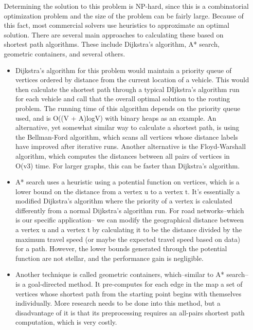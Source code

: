 \documentclass[onecolumn, draftclsnofoot,10pt, compsoc]{IEEEtran}
\begin{document}
Determining the solution to this problem is NP-hard, since this is a combinatorial optimization problem and the size of the problem can be fairly large.
Because of this fact, most commercial solvers use heuristics to approximate an optimal solution.
There are several main approaches to calculating these based on shortest path algorithms.
These include Dijkstra's algorithm, A* search, geometric containers, and several others.
\begin{itemize}
\item
Dijkstra's algorithm for this problem would maintain a priority queue of vertices ordered by distance from the current location of a vehicle.
This would then calculate the shortest path through a typical DIjkstra's algorithm run for each vehicle and call that the overall optimal solution to the routing problem.
The running time of this algorithm depends on the priority queue used, and is O((V + A)logV) with binary heaps as an example.
An alternative, yet somewhat similar way to calculate a shortest path, is using the Bellman-Ford algorithm, which scans all vertices whose distance labels have improved after iterative runs.
Another alternative is the Floyd-Warshall algorithm, which computes the distances between all pairs of vertices in O(v3) time.
For larger graphs, this can be faster than Dijkstra's algorithm\cite{bast2016route}.
\item
A* search uses a heuristic using a potential function on vertices, which is a lower bound on the distance from a vertex u to a vertex t.
It's essentially a modified Dijkstra's algorithm where the priority of a vertex is calculated differently from a normal Dijkstra's algorithm run.
For road networks--which is our specific application-- we can modify the geographical distance between a vertex u and a vertex t by calculating it to be the distance divided by the maximum travel speed (or maybe the expected travel speed based on data) for a path.
However, the lower bounds generated through the potential function are not stellar, and the performance gain is negligible\cite{bast2016route}.
\item
Another technique is called geometric containers, which--similar to A* search-- is a goal-directed method.
It pre-computes for each edge in the map a set of vertices whose shortest path from the starting point begins with themselves individually.
More research needs to be done into this method, but a disadvantage of it is that its preprocessing requires an all-pairs shortest path computation, which is very costly\cite{bast2016route}.
\end{itemize}
\end{document}

